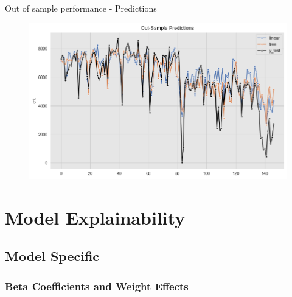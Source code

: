 \documentclass[10pt]{beamer}
\begin{document}
\begin{frame}{Out of sample performance - Predictions}
\begin{center}
  \begin{figure}
    \includegraphics[scale=0.45]{images/interpretable_ml_47_0.png} 
  \end{figure}
\end{center}
\end{frame}

\section{Model Explainability}

\subsection{Model Specific} 

\subsubsection{Beta Coefficients and Weight Effects}
\end{document}
